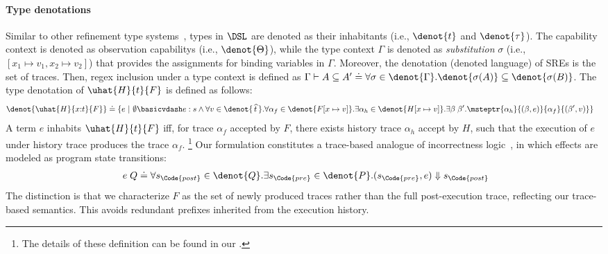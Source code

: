 \paragraph{Type denotations} Similar to other refinement type systems~\cite{JV21},
types in $\DSL$ are denoted as their inhabitants (i.e., $\denot{t}$ and $\denot{\tau}$).  The capability context is denoted as  observation capabilitys (i.e., $\denot{\Theta}$), while the type context $\Gamma$ is denoted as \emph{substitution} $\sigma$ (i.e., $[x_1\mapsto v_1, x_2\mapsto v_2]$) that provides the assignments for binding variables in $\Gamma$. Moreover, the denotation (denoted language) of SREs is the set of traces. Then, regex
inclusion under a type context is defined as $\Gamma \vdash A \subseteq
A' \doteq \forall \sigma \in \denot{\Gamma}. \denot{\sigma(A)}
\subseteq \denot{\sigma(B)}$.
The type denotation of $\uhat{H}{t}{F}$ is defined as follows:
{\small\begin{align*}
  &\denot{\uhat{H}{x{:}t}{F}} \doteq \{e ~|~ \emptyset \basicvdash e : s \land \forall v \in \denot{\,\widehat{t}\,}. \forall \alpha_f \in \denot{F[x\mapsto v]}. \exists \alpha_h \in\denot{H[x\mapsto v]}. \exists \beta\;\beta'. \msteptr{\alpha_h}{(\beta, e)}{\alpha_f}{(\beta',  v)} \}
\end{align*}}\noindent
A term $e$ inhabits $\uhat{H}{t}{F}$ iff, for trace $\alpha_f$ accepted by $F$, there exists history trace $\alpha_h$ accept by $H$, such that the execution of $e$ under history trace produces the trace $\alpha_f$.
\footnote{The details of these definition can be found in our \techreport{}.}
Our formulation constitutes a trace-based analogue of incorrectness logic~\cite{OHP19}, in which effects are modeled as program state transitions:
\begin{align*}
  [P]\; e\; Q \doteq \forall s_\Code{post} \in \denot{Q}. \exists s_\Code{pre} \in \denot{P}. (s_\Code{pre}, e) \Downarrow s_\Code{post}
\end{align*}
The distinction is that we characterize $F$ as the set of newly produced traces rather than the full post-execution trace, reflecting our trace-based semantics. This avoids redundant prefixes inherited from the execution history.

